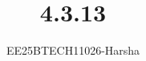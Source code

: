 \documentclass[journal]{IEEEtran}
\begin{document}

\vspace{3cm}

\title{4.3.13}
\author{EE25BTECH11026-Harsha}
 \maketitle
{\let\newpage\relax\maketitle}

\renewcommand{\thefigure}{\theenumi}
\renewcommand{\thetable}{\theenumi}
\setlength{\intextsep}{10pt} %


\renewcommand{\thetable}{\theenumi}
\end{document}
